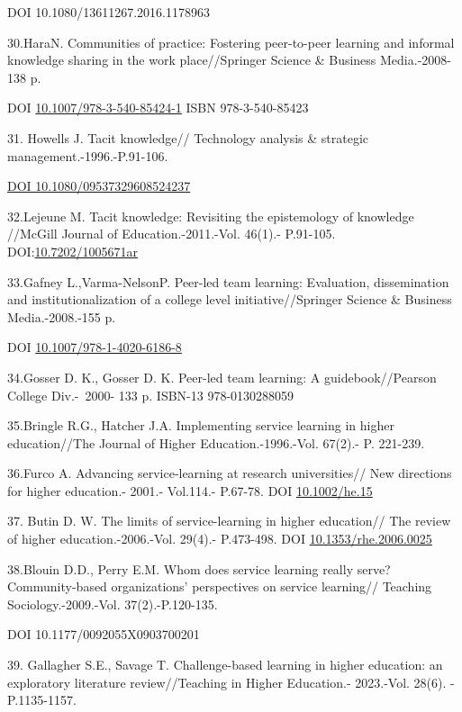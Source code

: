 DOI 10.1080/13611267.2016.1178963

30.HaraN. Communities of practice: Fostering peer-to-peer learning and
informal knowledge sharing in the work place//Springer Science \&
Business Media.-2008-138 p.

DOI
\href{http://dx.doi.org/10.1007/978-3-540-85424-1}{10.1007/978-3-540-85424-1}
ISBN 978-3-540-85423

31. Howells J. Tacit knowledge// Technology analysis \& strategic
management.-1996.-P.91-106.

\href{https://doi.org/10.1080/09537329608524237}{DOI
10.1080/09537329608524237}

32.Lejeune M. Tacit knowledge: Revisiting the epistemology of knowledge
//McGill Journal of Education.-2011.-Vol. 46(1).- P.91-105.
DOI:\href{http://dx.doi.org/10.7202/1005671ar}{10.7202/1005671ar}

33.Gafney L.,Varma-NelsonP. Peer-led team learning: Evaluation,
dissemination and institutionalization of a college level
initiative//Springer Science \& Business Media.-2008.-155 p.

DOI
\href{http://dx.doi.org/10.1007/978-1-4020-6186-8}{10.1007/978-1-4020-6186-8}

34.Gosser D. K., Gosser D. K. Peer-led team learning: A
guidebook//Pearson College Div.-~2000- 133 p. ISBN-13 ‏ ~978-0130288059

35.Bringle R.G., Hatcher J.A. Implementing service learning in higher
education//The Journal of Higher Education.-1996.-Vol. 67(2).- P.
221-239.

36.Furco A. Advancing service‐learning at research universities// New
directions for higher education.- 2001.- Vol.114.- P.67-78. DOI
\href{http://dx.doi.org/10.1002/he.15}{10.1002/he.15}

37. Butin D. W. The limits of service-learning in higher education// The
review of higher education.-2006.-Vol. 29(4).- P.473-498. DOI
\href{http://dx.doi.org/10.1353/rhe.2006.0025}{10.1353/rhe.2006.0025}

38.Blouin D.D., Perry E.M. Whom does service learning really serve?
Community-based organizations'{} perspectives on service
learning// Teaching Sociology.-2009.-Vol. 37(2).-P.120-135.

DOI 10.1177/0092055X0903700201

39. Gallagher S.E., Savage T. Challenge-based learning in higher
education: an exploratory literature review//Teaching in Higher
Education.- 2023.-Vol. 28(6). - P.1135-1157.

